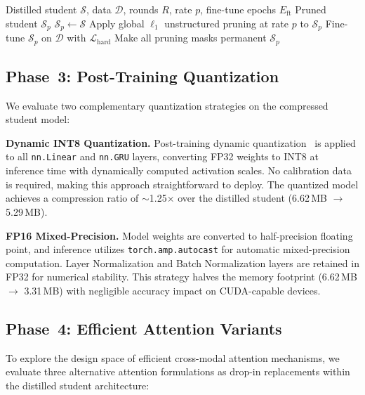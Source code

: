 \documentclass[lettersize,journal]{IEEEtran}
\begin{document}
\begin{algorithm}[!t]
\caption{Iterative Pruning with Fine-Tuning Recovery}
\label{alg:pruning}
\begin{algorithmic}[1]
\REQUIRE Distilled student $\mathcal{S}$, data $\mathcal{D}$, rounds $R$, rate $p$, fine-tune epochs $E_{\text{ft}}$
\ENSURE Pruned student $\mathcal{S}_p$
\STATE $\mathcal{S}_p \leftarrow \mathcal{S}$
    \STATE Apply global $\ell_1$ unstructured pruning at rate $p$ to $\mathcal{S}_p$
        \STATE Fine-tune $\mathcal{S}_p$ on $\mathcal{D}$ with $\mathcal{L}_{\text{hard}}$
    \ENDFOR
\ENDFOR
\STATE Make all pruning masks permanent
\RETURN $\mathcal{S}_p$
\end{algorithmic}
\end{algorithm}


\subsection{Phase~3: Post-Training Quantization}
\label{sec:quantization}

We evaluate two complementary quantization strategies on the compressed student model:

\textbf{Dynamic INT8 Quantization.} Post-training dynamic quantization~\cite{jacob2018quantization} is applied to all \texttt{nn.Linear} and \texttt{nn.GRU} layers, converting FP32 weights to INT8 at inference time with dynamically computed activation scales. No calibration data is required, making this approach straightforward to deploy. The quantized model achieves a compression ratio of $\sim$1.25$\times$ over the distilled student (6.62\,MB $\rightarrow$ 5.29\,MB).

\textbf{FP16 Mixed-Precision.} Model weights are converted to half-precision floating point, and inference utilizes \texttt{torch.amp.autocast} for automatic mixed-precision computation. Layer Normalization and Batch Normalization layers are retained in FP32 for numerical stability. This strategy halves the memory footprint (6.62\,MB $\rightarrow$ 3.31\,MB) with negligible accuracy impact on CUDA-capable devices.


\subsection{Phase~4: Efficient Attention Variants}
\label{sec:attn_variants}

To explore the design space of efficient cross-modal attention mechanisms, we evaluate three alternative attention formulations as drop-in replacements within the distilled student architecture:
\end{document}
